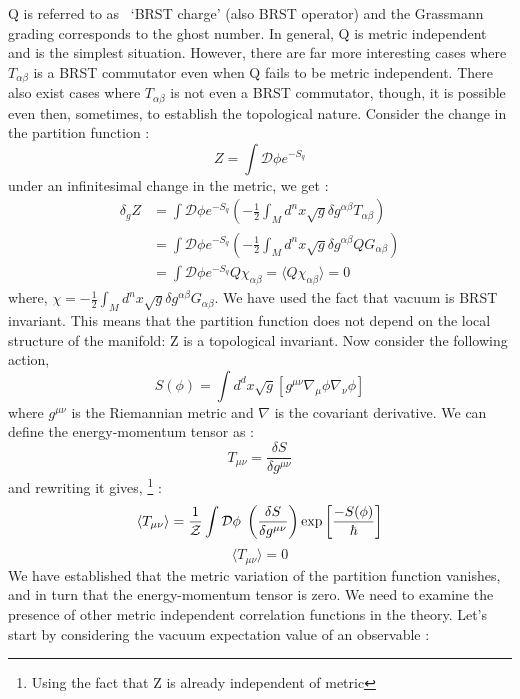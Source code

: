 Q is referred to as ~`BRST charge' (also BRST operator) and the Grassmann grading corresponds to the ghost number. 
In general, Q is metric independent and is the simplest situation. However, there are far more interesting cases 
where $T_{\alpha\beta}$ is a BRST commutator even when Q fails to be metric independent. There also exist cases 
where $T_{\alpha\beta}$ is not even a BRST commutator, though, it is possible even then, sometimes, to establish the
topological nature. 
Consider the change in the partition function :
\begin{equation}
Z = \int \mathcal{D} \phi e^{-S_{q}}
\end{equation}
under an infinitesimal change in the metric, we get :
\begin{align}
\delta_{g} Z&= \int \mathcal{D} \phi e^{-S_{q}} \left(-\frac{1}{2} \int_{M} d^{n} x 
\sqrt{g} \delta g^{\alpha\beta} T_{\alpha\beta}\right)\\
&=\int \mathcal{D} \phi e^{-S_{q}} \left(-\frac{1}{2} \int_{M} d^{n} x 
\sqrt{g} \delta g^{\alpha\beta} QG_{\alpha\beta}\right)\\
&=\int \mathcal{D} \phi e^{-S_{q}} Q\chi_{\alpha\beta} = \langle Q\chi_{\alpha\beta}\rangle = 0
\end{align}
where, $ \chi = - \frac{1}{2} \int_{M} d^{n}x \sqrt{g} \delta g^{\alpha\beta} G_{\alpha\beta}$. We have 
used the fact that vacuum is BRST invariant. 
This means that the partition function does not depend on the local structure of the manifold: 
Z is a topological invariant. 
Now consider the following action, 
\begin{equation}
S(\phi) = \int d^{d} x \sqrt{g} \left[g^{\mu\nu} \nabla_{\mu} \phi  \nabla_{\nu} \phi \right]
\end{equation}
where $g^{\mu\nu}$ is the Riemannian metric and $\nabla$ is the covariant derivative. We can define the energy-momentum tensor as :
\begin{equation}
T_{\mu\nu} = \frac{\delta S}{\delta g^{\mu\nu}} 
\end{equation}
and rewriting it gives, \footnote{Using the fact that Z is already independent of metric} : 
\begin{equation}
\langle T_{\mu\nu} \rangle =  \frac{1}{\mathcal{Z}}\int \mathcal{D} \phi \hspace{1mm} \left(\frac{\delta S}{\delta g^{\mu\nu}}\right) \exp\left[\frac{-S(\phi)}{\hbar}\right]  
\end{equation}
\begin{equation}
\langle T_{\mu\nu} \rangle= 0
\end{equation}
We have established that the metric variation of the partition function vanishes, and in turn that the energy-momentum tensor is zero.  
We need to examine the presence of other metric independent correlation functions in the theory. 
Let's start by considering the vacuum expectation value of an observable :

